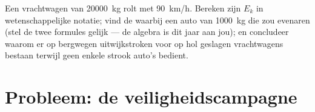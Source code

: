 \begin{exercise}[$\star\star\star$]\label{exo:g9:kinetic-energy-safety:12}
Een vrachtwagen van \qty{20000}{kg} rolt met \qty{90}{km/h}. Bereken
zijn $E_k$ in wetenschappelijke notatie; vind de 
waarbij een auto van \qty{1000}{kg} die  zou evenaren
(stel de twee formules gelijk --- de algebra is dit jaar aan jou); en
concludeer waarom er op bergwegen uitwijkstroken voor op hol geslagen
vrachtwagens bestaan terwijl geen enkele strook auto's bedient.
\end{exercise}

\section{Probleem: de veiligheidscampagne}


